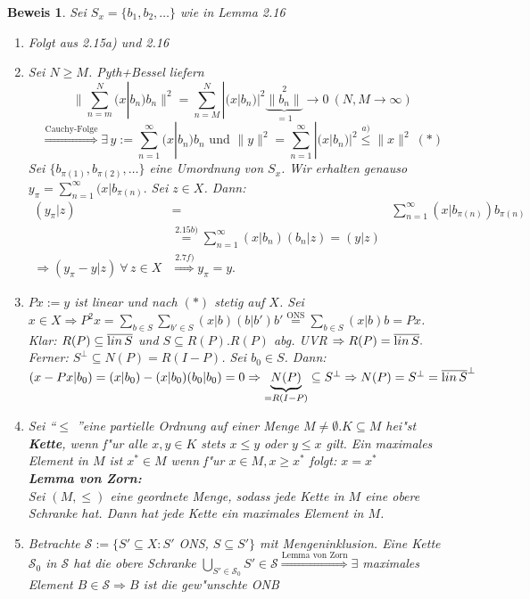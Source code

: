 \documentclass[a4paper,11pt]{book}
\newcommand{\begriff}[1]{\textbf{#1}} %
\newcommand{\lin}{\ensuremath{\text lin}\,} %
\theoremstyle{nonumberplain}
\newtheorem{Bew}{Beweis}
\begin{document}
\begin{Bew}
Sei $S_x = \{b_1,b_2,\dots\}$ wie in Lemma 2.16
\begin{enumerate}
\item[a)] Folgt aus 2.15a) und 2.16

\item[b)] Sei $N \geq M$. Pyth+Bessel liefern
\[
\| \sum_{n=m}^N (x|b_n)b_n \|^2 = \sum_{n=M}^N | (x|b_n)|^2 \underbrace{\|b_n\|}_{=1}^2 \rightarrow 0 \ (N,M \rightarrow \infty)
\]
\[
\stackrel{\text{Cauchy-Folge}}{\Rightarrow} \exists\, y := \sum_{n=1}^{\infty} (x|b_n)b_n \text{ und } \|y\|^2 = \sum_{n=1}^{\infty} |(x|b_n)|^2 \stackrel{a)}{\leq} \|x\|^2 \ (\ast)
\]
Sei $\{b_{\pi(1)},b_{\pi(2)},\dots\}$ eine Umordnung von $S_x$. Wir erhalten genauso $y_{\pi} = \sum_{n=1}^{\infty} (x|b_{\pi(n)}.$ Sei $z \in X$. Dann:
\begin{eqnarray*}
(y_{\pi}|z) & = & \sum_{n=1}^{\infty} (x|b_{\pi(n)})b_{\pi(n)} \\
& \stackrel{2.15b)}{=} \sum_{n=1}^{\infty} (x|b_n)(b_n|z) = (y|z) \\
\Rightarrow (y_{\pi}-y|z) \ \forall\, z \in X & \stackrel{2.7f)}{\Rightarrow} y_{\pi} = y.
\end{eqnarray*}

\item[c)] $Px := y$ ist linear und nach $(\ast)$ stetig auf $X$. Sei $x \in X \Rightarrow P^2x = \sum_{b \in S} \sum_{b' \in S} (x|b)(b|b')b' \stackrel{\text{ONS}}{=} \sum_{b \in S} (x|b)b = Px$.\\
Klar: $R(P) \subseteq \overline{\lin S}$ und $S \subseteq R(P). R(P)$ abg. UVR $\Rightarrow R(P) = \overline{\lin S}.$ Ferner: $S^{\perp} \subseteq N(P) = R(I-P)$. Sei $b_0 \in S$. Dann: $(x-Px|b_0) = (x|b_0)-(x|b_0)(b_0|b_0) = 0 \Rightarrow \underbrace{N(P)}_{= R(I-P)} \subseteq S^{\perp} \Rightarrow N(P) = S^{\perp} = \overline{\lin S}^{\perp}$

\item[zu d)] Sei \textquotedblleft $\leq$ \textquotedblright eine partielle Ordnung auf einer Menge $M \not= \emptyset. K \subseteq M$ hei"st \begriff{Kette}, wenn f"ur alle $x,y \in K$ stets $x \leq y$ oder $y \leq x$ gilt. Ein maximales Element in $M$ ist $x^{\ast} \in M$ wenn f"ur $x \in M, x \geq x^{\ast}$ folgt: $x = x^{\ast}$\\
\textbf{Lemma von Zorn:}\\
Sei $(M,\leq)$ eine geordnete Menge, sodass jede Kette in $M$ eine obere Schranke hat. Dann hat jede Kette ein maximales Element in $M$.

\item[d)] Betrachte $\mathcal{S} := \{ S' \subseteq X: S'$ ONS, $S \subseteq S'\}$ mit Mengeninklusion. Eine Kette $\mathcal{S}_0$ in $\mathcal{S}$ hat die obere Schranke $\bigcup_{S' \in \mathcal{S}_0} S' \in \mathcal{S} \stackrel{\text{Lemma von Zorn}}{\Rightarrow} \exists$ maximales Element $B \in \mathcal{S} \Rightarrow B$ ist die gew"unschte ONB
\end{enumerate}
\end{Bew}
\end{document}
